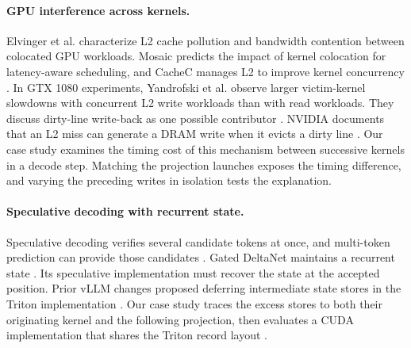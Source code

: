 \paragraph{GPU interference across kernels.}
Elvinger et al. characterize L2 cache pollution and bandwidth
contention between colocated GPU workloads. Mosaic predicts the impact
of kernel colocation for latency-aware scheduling, and CacheC manages
L2 to improve kernel concurrency
\cite{elvinger2025gpu,strati2026mosaic,xi2026cachec}.
In GTX 1080 experiments, Yandrofski et al. observe larger victim-kernel
slowdowns with concurrent L2 write workloads than with read workloads.
They discuss dirty-line write-back as one possible contributor
\cite{yandrofski2022enemies}. NVIDIA documents that an L2 miss can
generate a DRAM write when it evicts a dirty line
\cite{nvidiaComputeTriage}.
Our case study examines the timing cost of this mechanism between
successive kernels in a decode step.
Matching the projection launches exposes the timing difference, and
varying the preceding writes in isolation tests the explanation.

\paragraph{Speculative decoding with recurrent state.}
Speculative decoding verifies several candidate tokens at once, and
multi-token prediction can provide those candidates
\cite{leviathan2023fast,deepseekv3}. Gated DeltaNet maintains a recurrent
state \cite{yang2025gated}. Its speculative implementation must recover
the state at the accepted position. Prior vLLM changes proposed deferring
intermediate state stores in the Triton implementation
\cite{vllmpr61434,vllmpr64325}. Our case study traces
the excess stores to both their originating kernel and the following
projection, then evaluates a CUDA implementation that shares the
Triton record layout \cite{vllmpr69160}.
